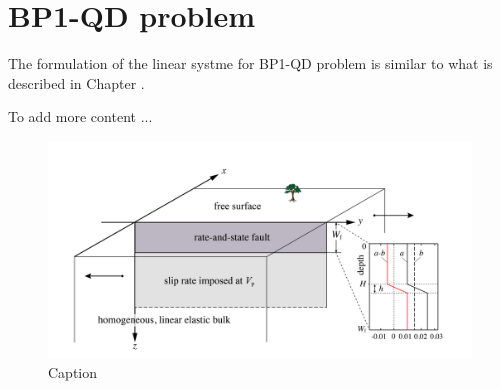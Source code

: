 \section{BP1-QD problem}

The formulation of the linear systme for BP1-QD problem is similar to what is described in Chapter \label{chap:matrix-free}.

To add more content ...

\begin{figure}
    \centering
    \includegraphics[width=\linewidth]{figures/BP1-figure}
    \caption{Caption}
    \label{fig:enter-label}
\end{figure}